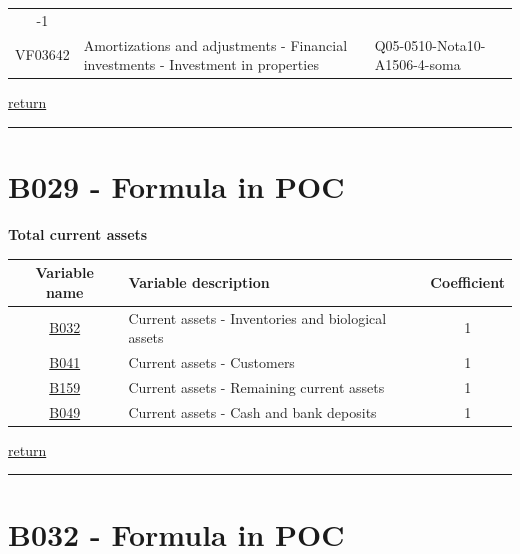 \documentclass[]{book}
\begin{document}
\begin{longtable}[]{@{}cllc@{}}
\begin{minipage}[t]{0.11\columnwidth}
-1\strut
\end{minipage}\tabularnewline
\begin{minipage}[t]{0.13\columnwidth}\centering
VF03642\strut
\end{minipage} & \begin{minipage}[t]{0.31\columnwidth}\raggedright
Amortizations and adjustments - Financial investments - Investment in properties\strut
\end{minipage} & \begin{minipage}[t]{0.33\columnwidth}\raggedright
Q05-0510-Nota10-A1506-4-soma\strut
\end{minipage} & \begin{minipage}[t]{0.11\columnwidth}\centering
1\strut
\end{minipage}\tabularnewline
\bottomrule
\end{longtable}

\protect\hyperlink{assets}{return}

\begin{center}\rule{0.5\linewidth}{\linethickness}\end{center}

\hypertarget{b029---formula-in-poc}{%
\section{B029 - Formula in POC}\label{b029---formula-in-poc}}

\textbf{Total current assets}

\begin{longtable}[]{@{}clc@{}}
\toprule
Variable name & Variable description & Coefficient\tabularnewline
\midrule
\endhead
\protect\hyperlink{b032---formula-in-poc}{B032} & Current assets - Inventories and biological assets & 1\tabularnewline
\protect\hyperlink{b041---formula-in-poc}{B041} & Current assets - Customers & 1\tabularnewline
\protect\hyperlink{b159---formula-in-poc}{B159} & Current assets - Remaining current assets & 1\tabularnewline
\protect\hyperlink{b049---formula-in-poc}{B049} & Current assets - Cash and bank deposits & 1\tabularnewline
\bottomrule
\end{longtable}

\protect\hyperlink{assets}{return}

\begin{center}\rule{0.5\linewidth}{\linethickness}\end{center}

\hypertarget{b032---formula-in-poc}{%
\section{B032 - Formula in POC}\label{b032---formula-in-poc}}
\end{document}
